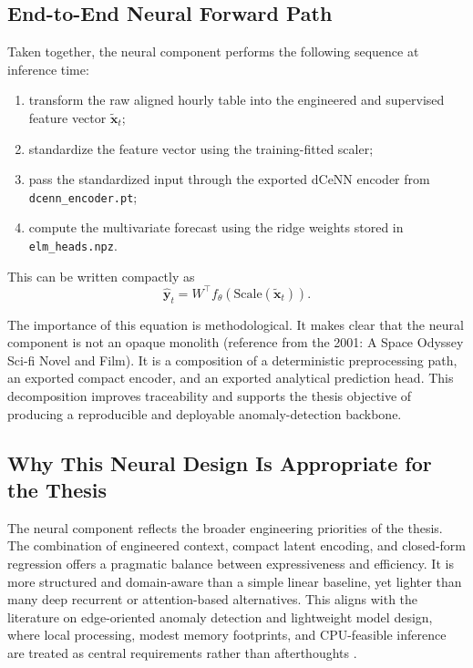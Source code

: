 \subsection{End-to-End Neural Forward Path}

Taken together, the neural component performs the following sequence at inference time:
\begin{enumerate}
	\item transform the raw aligned hourly table into the engineered and supervised feature vector $\tilde{\mathbf{x}}_t$;
	\item standardize the feature vector using the training-fitted scaler;
	\item pass the standardized input through the exported dCeNN encoder from \texttt{dcenn\_encoder.pt};
	\item compute the multivariate forecast using the ridge weights stored in \texttt{elm\_heads.npz}.
\end{enumerate}
This can be written compactly as
\begin{equation}
	\hat{\mathbf{y}}_t
	=
	W^{\top}
	f_{\theta}\!\left(
	\mathrm{Scale}\!\left(\tilde{\mathbf{x}}_t\right)
	\right).
	\label{eq:neural_forward_path}
\end{equation}

The importance of this equation is methodological. It makes clear that the neural component is not an opaque monolith (reference from  the 2001: A Space Odyssey Sci-fi Novel and Film). It is a composition of a deterministic preprocessing path, an exported compact encoder, and an exported analytical prediction head. This decomposition improves traceability and supports the thesis objective of producing a reproducible and deployable anomaly-detection backbone.

\subsection{Why This Neural Design Is Appropriate for the Thesis}

The neural component reflects the broader engineering priorities of the thesis. The combination of engineered context, compact latent encoding, and closed-form regression offers a pragmatic balance between expressiveness and efficiency. It is more structured and domain-aware than a simple linear baseline, yet lighter than many deep recurrent or attention-based alternatives. This aligns with the literature on edge-oriented anomaly detection and lightweight model design, where local processing, modest memory footprints, and CPU-feasible inference are treated as central requirements rather than afterthoughts \cite{antonini2023tinyml,howard2017mobilenets}.

